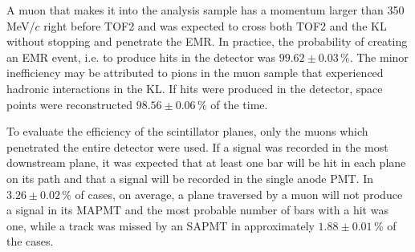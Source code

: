 
A muon that makes it into the analysis sample has a momentum larger than 350\,MeV/$c$ right before TOF2 and was expected to cross both TOF2 and the KL without stopping and penetrate the EMR. In practice, the probability of creating an EMR event, i.e. to produce hits in the detector was $99.62\pm0.03\,\%$. The minor inefficiency may be attributed to pions in the muon sample that experienced hadronic interactions in the KL. If hits were produced in the detector, space points were reconstructed $98.56\pm0.06\,\%$ of the time.

To evaluate the efficiency of the scintillator planes, only the muons which penetrated the entire detector were used. If a signal was recorded in the most downstream plane, it was expected that at least one bar will be hit in each plane on its path and that a signal will be recorded in the single anode PMT.
In $3.26\pm0.02\,\%$ of cases, on average, a plane traversed by a muon will not produce a signal in its MAPMT and the most probable number of bars with a hit was one, while a track was missed by an SAPMT in approximately $1.88\pm0.01\,\%$ of the cases. 

%

